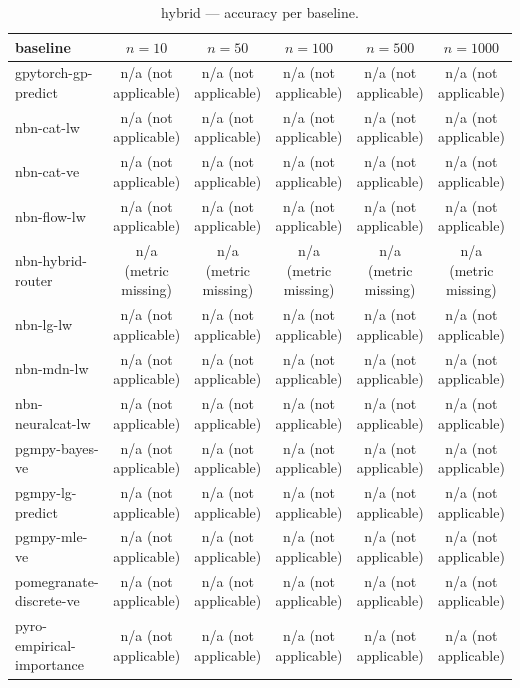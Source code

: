 \begin{table}[h]
\centering
\caption{hybrid — accuracy per baseline.}
\label{tab:hybrid_accuracy}
\begin{tabular}{lccccc}
\toprule
baseline & $n=10$ & $n=50$ & $n=100$ & $n=500$ & $n=1000$ \\
\midrule
gpytorch-gp-predict & n/a (not applicable) & n/a (not applicable) & n/a (not applicable) & n/a (not applicable) & n/a (not applicable) \\
nbn-cat-lw & n/a (not applicable) & n/a (not applicable) & n/a (not applicable) & n/a (not applicable) & n/a (not applicable) \\
nbn-cat-ve & n/a (not applicable) & n/a (not applicable) & n/a (not applicable) & n/a (not applicable) & n/a (not applicable) \\
nbn-flow-lw & n/a (not applicable) & n/a (not applicable) & n/a (not applicable) & n/a (not applicable) & n/a (not applicable) \\
nbn-hybrid-router & n/a (metric missing) & n/a (metric missing) & n/a (metric missing) & n/a (metric missing) & n/a (metric missing) \\
nbn-lg-lw & n/a (not applicable) & n/a (not applicable) & n/a (not applicable) & n/a (not applicable) & n/a (not applicable) \\
nbn-mdn-lw & n/a (not applicable) & n/a (not applicable) & n/a (not applicable) & n/a (not applicable) & n/a (not applicable) \\
nbn-neuralcat-lw & n/a (not applicable) & n/a (not applicable) & n/a (not applicable) & n/a (not applicable) & n/a (not applicable) \\
pgmpy-bayes-ve & n/a (not applicable) & n/a (not applicable) & n/a (not applicable) & n/a (not applicable) & n/a (not applicable) \\
pgmpy-lg-predict & n/a (not applicable) & n/a (not applicable) & n/a (not applicable) & n/a (not applicable) & n/a (not applicable) \\
pgmpy-mle-ve & n/a (not applicable) & n/a (not applicable) & n/a (not applicable) & n/a (not applicable) & n/a (not applicable) \\
pomegranate-discrete-ve & n/a (not applicable) & n/a (not applicable) & n/a (not applicable) & n/a (not applicable) & n/a (not applicable) \\
pyro-empirical-importance & n/a (not applicable) & n/a (not applicable) & n/a (not applicable) & n/a (not applicable) & n/a (not applicable) \\
\bottomrule
\end{tabular}
\end{table}

